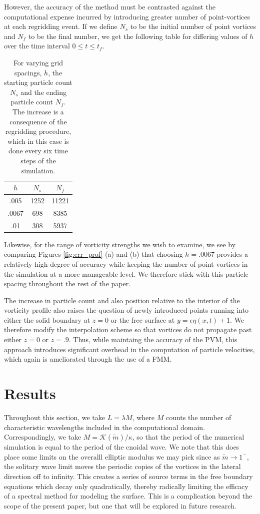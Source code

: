 \documentclass[a4paper,11pt]{article}
\begin{document}
However, the accuracy of the method must be contrasted against the computational expense incurred by introducing greater number of point-vortices at each regridding event.  If we define $N_{s}$ to be the initial number of point vortices and $N_{f}$ to be the final number, we get the following table for differing values of $h$ over the time interval $0\leq t \leq t_{f}$.
\begin{table}
\centering
\begin{tabular}{c|cc}
$h$ & $N_{s}$ & $N_{f}$\\
\hline
.005 & 1252 & 11221\\
.0067 & 698 & 8385\\
.01 & 308 & 5937
\end{tabular}
\caption{For varying grid spacings, $h$, the starting particle count $N_{s}$ and the ending particle count $N_{f}$.  The increase is a consequence of the regridding procedure, which in this case is done every six time steps of the simulation.  }
\end{table}
Likewise, for the range of vorticity strengths we wish to examine, we see by comparing Figures \ref{fig:err_prof} (a) and (b) that choosing $h=.0067$  provides a relatively high-degree of accuracy while keeping the number of point vortices in the simulation at a more manageable level.  We therefore stick with this particle spacing throughout the rest of the paper.  

The increase in particle count and also position relative to the interior of the vorticity profile also raises the question of newly introduced points running into either the solid boundary at $z=0$ or the free surface at $y=\epsilon\eta(x,t)+1$.  We therefore modify the interpolation scheme so that vortices do not propagate past either $z=0$ or $z=.9$.    Thus, while maintaing the accuracy of the PVM, this approach introduces significant overhead in the computation of particle velocities, which again is ameliorated through the use of a FMM.  

\section{Results}
Throughout this section, we take $L = \lambda M$, where $M$ counts the number of characteristic wavelengths included in the computational domain.   Correspondingly, we take $M=\mathcal{K}(\tilde{m})/\kappa$, so that the period of the numerical simulation is equal to the period of the cnoidal wave.   We note that this does place some limits on the overalll elliptic modulus we may pick since as $\tilde{m}\rightarrow 1^{-}$, the solitary wave limit moves the periodic copies of the vortices in the lateral direction off to infinity.  This creates a series of source terms in the free boundary equations which decay only quadratically, thereby radically limiting the efficacy of a spectral method for modeling the surface.  This is a complication beyond the scope of the present paper, but one that will be explored in future research.  
\end{document}
